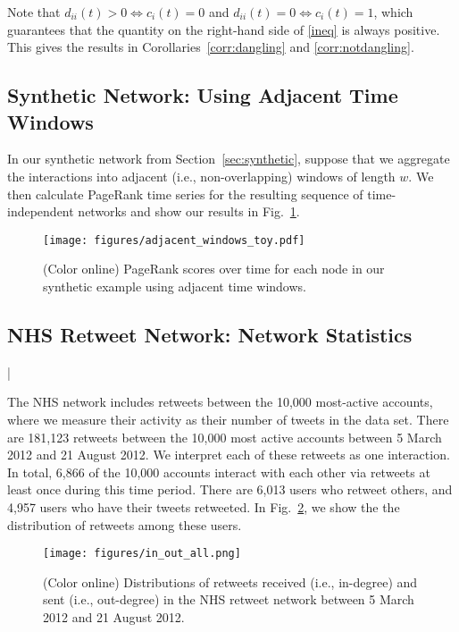 \documentclass[journal,transmag]{IEEEtran}
\begin{document}

Note that $d_{ii}(t) > 0 \iff c_i(t) = 0$ and $d_{ii}(t) = 0 \iff
c_i(t) = 1$, which guarantees that the quantity on the right-hand side
of \eqref{ineq} is always positive. This gives the results in
Corollaries~\ref{corr:dangling} and \ref{corr:notdangling}.


\subsection{Synthetic Network: Using Adjacent Time Windows}
\label{sec:synthetic_adjacent_windows}
%
In our synthetic network from Section~\ref{sec:synthetic}, suppose that we aggregate the interactions into adjacent (i.e., non-overlapping) windows of length $w$. We then calculate PageRank time series for the resulting sequence of time-independent networks and show our results in Fig.~\ref{fig:synNetAdjWin}.


\begin{figure}[htp]
  \centering
  \texttt{[image: figures/adjacent\_windows\_toy.pdf]}
  \caption{(Color online) 
  PageRank scores over time for each node in our synthetic example
    using adjacent time windows.}
  \label{fig:synNetAdjWin}
\end{figure}


\subsection{NHS Retweet Network: Network Statistics}
\label{sec:NHSnetworkstats}|

The NHS network includes retweets between the 10,000 most-active accounts, where we measure their activity as their number of tweets in the data set. 
   There are 181,123 retweets between the 10,000 most active accounts between 5 March 2012 and 21 August 2012.
   We interpret each of these retweets as one interaction.
 In total, 6,866 of the 10,000 accounts interact with each other via retweets at least once during this time period. There are 6,013 users who retweet others, and 4,957 users who have their tweets retweeted. In Fig.~\ref{fig:retweetsUserDist}, we show the the distribution of retweets among these users.


\begin{figure}[htp]
  \centering
  \texttt{[image: figures/in\_out\_all.png]}
  \caption{(Color online) 
  Distributions of retweets received (i.e., in-degree) and sent (i.e., out-degree) in the NHS retweet network between 5 March 2012 and 21 August 2012.
  }
  \label{fig:retweetsUserDist}
\end{figure}
\end{document}
